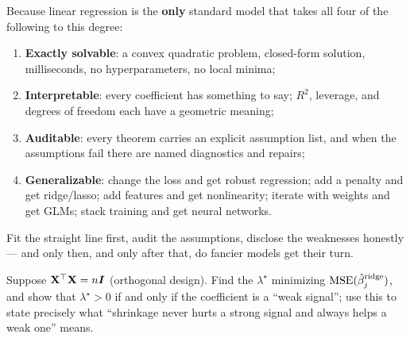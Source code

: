 \begin{keybox}
Because linear regression is the \textbf{only} standard model that takes all four of the following to this degree:
\begin{enumerate}[label=(\roman*)]
  \item \textbf{Exactly solvable}: a convex quadratic problem, closed-form solution, milliseconds, no hyperparameters, no local minima;
  \item \textbf{Interpretable}: every coefficient has something to say; $R^2$, leverage, and degrees of freedom each have a geometric meaning;
  \item \textbf{Auditable}: every theorem carries an explicit assumption list, and when the assumptions fail there are named diagnostics and repairs;
  \item \textbf{Generalizable}: change the loss and get robust regression; add a penalty and get ridge/lasso; add features and get nonlinearity; iterate with weights and get GLMs; stack training and get neural networks.
\end{enumerate}
Fit the straight line first, audit the assumptions, disclose the weaknesses honestly --- and only then, and only after that, do fancier models get their turn.
\end{keybox}

\begin{exercise}\label{ex:orth-ridge}
Suppose $\mathbf{X}^\top\mathbf{X} = n\bm{I}$ (orthogonal design). Find the $\lambda^\star$ minimizing $\mathrm{MSE}(\hat\beta_j^{\mathrm{ridge}})$, and show that $\lambda^\star > 0$ if and only if the coefficient is a ``weak signal''; use this to state precisely what ``shrinkage never hurts a strong signal and always helps a weak one'' means.
\end{exercise}

